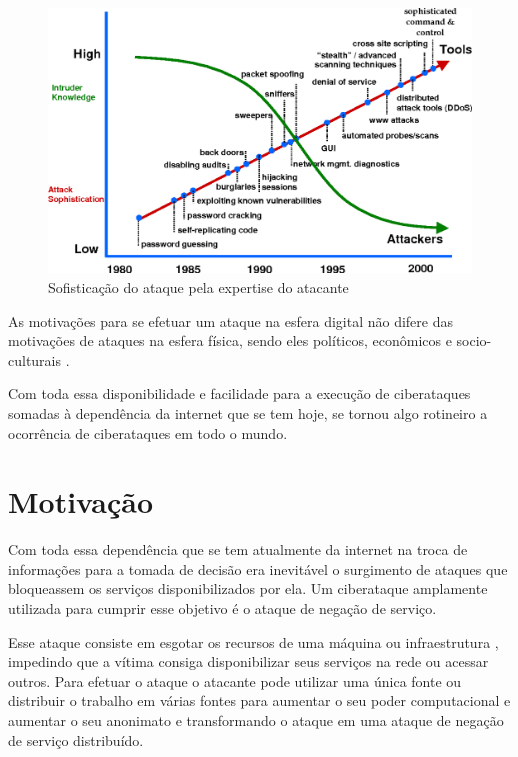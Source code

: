 \begin{figure}[H]
     \centering
     \includegraphics[scale=0.35]{img/24-Figure1-1.png}
     \caption{ Sofisticação do ataque pela expertise do atacante \cite{Lipson2002TrackingAT} }
     \label{img:ExpVSSof}
\end{figure}

As motivações para se efetuar um ataque na esfera digital não difere das motivações de ataques na esfera física, sendo eles políticos, econômicos e socio-culturais \cite{Gandhi2011}.

Com toda essa disponibilidade e facilidade para a execução de ciberataques somadas à dependência da internet que se tem hoje, se tornou algo rotineiro a ocorrência de ciberataques em todo o mundo. 

\section{Motivação}

Com toda essa dependência que se tem atualmente da internet na troca de informações para a tomada de decisão era inevitável o surgimento de ataques que bloqueassem os serviços disponibilizados por ela. Um ciberataque amplamente utilizada para cumprir esse objetivo é o ataque de negação de serviço.

Esse ataque consiste em esgotar os recursos de uma máquina ou infraestrutura , impedindo que a vítima consiga disponibilizar seus serviços na rede ou acessar outros. Para efetuar o ataque o atacante pode utilizar uma única fonte ou distribuir o trabalho em várias fontes para aumentar o seu poder computacional e aumentar o seu anonimato e transformando o ataque em uma ataque de negação de serviço distribuído. 

